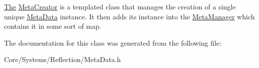 \hyperlink{classThe}{The} \hyperlink{classDCEngine_1_1MetaCreator}{Meta\-Creator} is a templated class that manages the creation of a single unique \hyperlink{classDCEngine_1_1MetaData}{Meta\-Data} instance. It then adds its instance into the \hyperlink{classDCEngine_1_1MetaManager}{Meta\-Manager} which contains it in some sort of map. 

The documentation for this class was generated from the following file\-:\begin{DoxyCompactItemize}
\item 
Core/\-Systems/\-Reflection/Meta\-Data.\-h\end{DoxyCompactItemize}
